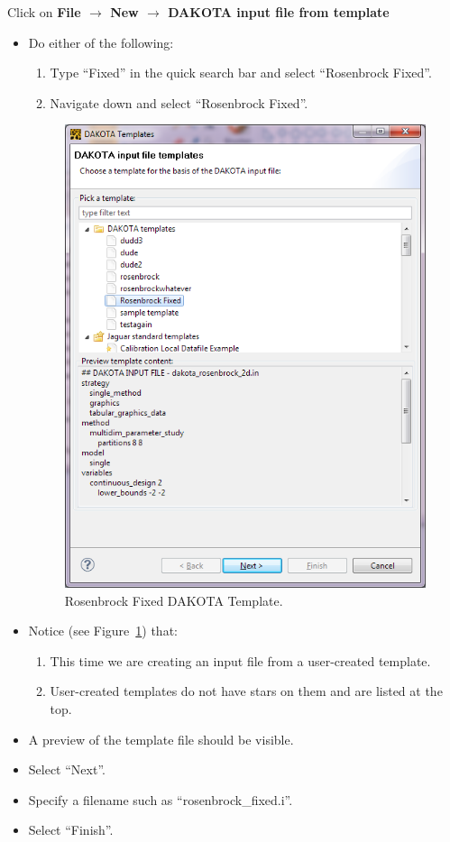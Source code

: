 Click on {\bf File $\rightarrow$ New $\rightarrow$ DAKOTA input file from template} 
\begin{itemize}
\item Do either of the following:
\begin{enumerate}
\item Type ``Fixed'' in the quick search bar and select ``Rosenbrock Fixed''.
\item Navigate down and select ``Rosenbrock Fixed''.
\end{enumerate}
\begin{figure}[htbp]
  \centering
  \includegraphics[scale=0.6]{images/10Template_Rosenbrock}
  \caption{Rosenbrock Fixed DAKOTA Template.}
  \label{fig:input:10Template_Rosenbrock}
\end{figure}

\item Notice (see Figure~\ref{fig:input:10Template_Rosenbrock}) that:
\begin{enumerate}
\item This time we are creating an input file from a user-created template.
\item User-created templates do not have stars on them and are listed at the top.
\end{enumerate} 
\item A preview of the template file should be visible.
\item Select ``Next''.
\item Specify a filename such as ``rosenbrock\_fixed.i''. 
\item Select ``Finish''.
\end{itemize}


